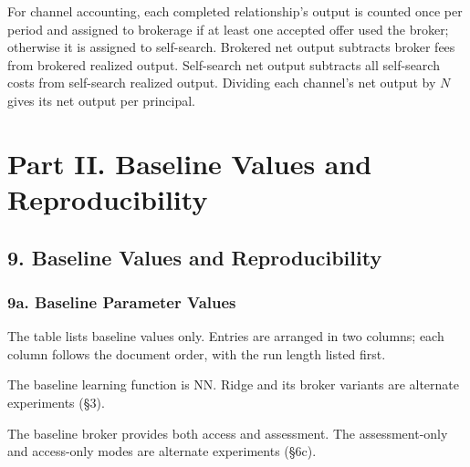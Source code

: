 \documentclass[11pt]{article}
\begin{document}
For channel accounting, each completed relationship's output is counted once per period and assigned to brokerage if at least one accepted offer used the broker; otherwise it is assigned to self-search. Brokered net output subtracts broker fees from brokered realized output. Self-search net output subtracts all self-search costs from self-search realized output. Dividing each channel's net output by \(N\) gives its net output per principal.

\section{Part II. Baseline Values and Reproducibility}\label{part-ii.-baseline-values-and-reproducibility}

\subsection{9. Baseline Values and Reproducibility}\label{baseline-values-and-reproducibility}

\subsubsection{9a. Baseline Parameter Values}\label{a.-baseline-parameter-values}

The table lists baseline values only. Entries are arranged in two columns; each column follows the document order, with the run length listed first.

The baseline learning function is NN. Ridge and its broker variants are alternate experiments (§3).

The baseline broker provides both access and assessment. The assessment-only and access-only modes are alternate experiments (§6c).
\end{document}
